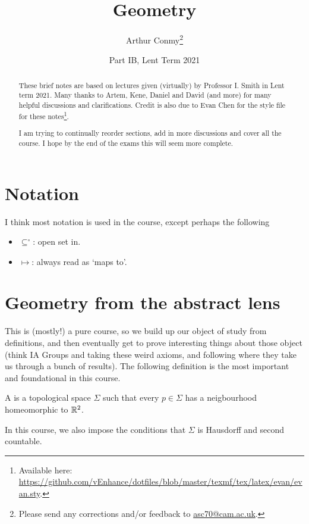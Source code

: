 \documentclass[11pt]{scrartcl}
\begin{document}
\title{Geometry}
\author{Arthur Conmy\footnote{Please send any corrections and/or feedback to \url{asc70@cam.ac.uk}.}}
\date{Part IB, Lent Term 2021}

\maketitle
\begin{abstract}
These brief notes are based on lectures given (virtually) by Professor I. Smith in Lent term 2021. 
Many thanks to Artem, Kene, Daniel and David (and more) for many helpful discussions and clarifications.
Credit is also due to Evan Chen for the style file for these notes\footnote{Available here: \url{https://github.com/vEnhance/dotfiles/blob/master/texmf/tex/latex/evan/evan.sty}.}.


I am trying to continually reorder sections, add in more discussions and cover all the course. I hope by the end of the exams this will seem more complete.
\end{abstract}


\section{Notation}

I think most notation is used in the course, except perhaps the following

\begin{itemize}
    \item $\subseteq^\circ$: open set in.
    \item $\mapsto$: always read as `maps to'.
\end{itemize}

\section{Geometry from the abstract lens}

This is (mostly!) a pure course, so we build up our object of study from definitions, and then eventually get to prove interesting things about those object (think IA Groups and taking these weird axioms, and following where they take us through a bunch of results). The following definition is the most important and foundational in this course.

\begin{definition}
[Surface]
\label{surface definition}
A  is a topological space $\Sigma$ such that every $p \in \Sigma$ has a neigbourhood homeomorphic to $\mathbb R^2$.

In this course, we also impose the conditions that $\Sigma$ is Hausdorff and second countable.
\end{definition}
\end{document}
